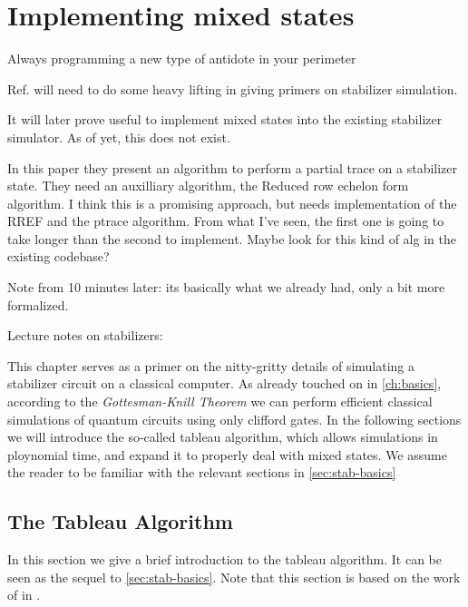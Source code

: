 \chapter{Implementing mixed states}
\label{ch:mixed}
\epigraph{Always programming a new type of antidote in your perimeter}{
\citeauthor{quasimotoDiscipline99Pt2000}
}

Ref. \cite{aaronsonImprovedSimulationStabilizer2004} will need to do some heavy
lifting in giving primers on stabilizer simulation.

It will later prove useful to implement mixed states into the existing
stabilizer simulator. As of yet, this does not exist.

In this paper \cite{audenaertEntanglementMixedStabilizer2005} they present an
algorithm to perform a partial trace on a stabilizer state. They need an
auxilliary algorithm, the Reduced row echelon form algorithm. I think this is a
promising approach, but needs implementation of the RREF and the ptrace
algorithm. From what I've seen, the first one is going to take longer than the
second to implement. Maybe look for this kind of alg in the existing codebase?

Note from 10 minutes later: its basically what we already had, only a bit more
formalized. 

Lecture notes on stabilizers: \cite{arabLectureNotesQuantum2024}

This chapter serves as a primer on the nitty-gritty details of simulating a
stabilizer circuit on a classical computer. As already touched on in
\cref{ch:basics}, according to the \emph{Gottesman-Knill Theorem} we can
perform efficient classical simulations of quantum circuits using only clifford
gates. In the following sections we will introduce the so-called tableau
algorithm, which allows simulations in ploynomial time, and expand it to
properly deal with mixed states. We assume the reader to be familiar with
the relevant sections in \cref{sec:stab-basics}

\section{The Tableau Algorithm}\label{sec:tableau}
In this section we give a brief introduction to the tableau algorithm. It can
be seen as the sequel to \cref{sec:stab-basics}. Note that this section is
based on the work of \citeauthor{aaronsonImprovedSimulationStabilizer2004} in
\cite{aaronsonImprovedSimulationStabilizer2004}.

